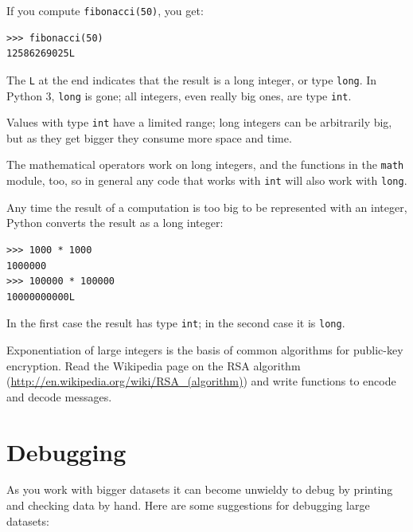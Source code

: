 \documentclass[10pt]{book}
\begin{document}
If you compute {\tt fibonacci(50)}, you get:

\begin{verbatim}
>>> fibonacci(50)
12586269025L
\end{verbatim}
%
The {\tt L} at the end indicates that the result is a long
integer, or type {\tt long}.  In Python 3, {\tt long} is gone; all integers,
even really big ones, are type {\tt int}.

Values with type {\tt int} have a limited range;
long integers can be arbitrarily big, but as they get bigger
they consume more space and time.

The mathematical operators work on long integers, and the functions
in the {\tt math} module, too, so in general any code that
works with {\tt int} will also work with {\tt long}.

Any time the result of a computation is too big to be represented with
an integer, Python converts the result as a long integer:

\begin{verbatim}
>>> 1000 * 1000
1000000
>>> 100000 * 100000
10000000000L
\end{verbatim}
%
In the first case the result has type {\tt int}; in the
second case it is {\tt long}.

\begin{exercise}

Exponentiation of large integers is the basis of common
algorithms for public-key encryption.  Read the Wikipedia
page on the RSA algorithm (\url{http://en.wikipedia.org/wiki/RSA_(algorithm)})
and write functions to encode and decode messages.


\end{exercise}


\section{Debugging}

As you work with bigger datasets it can become unwieldy to
debug by printing and checking data by hand.  Here are some
suggestions for debugging large datasets:
\end{document}
